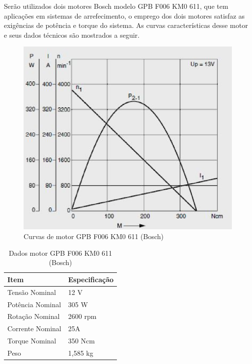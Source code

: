 Serão utilizados dois motores Bosch modelo GPB F006 KM0 611, que tem aplicações
em sistemas de arrefecimento, o emprego dos dois motores satisfaz as exigências
de potência e torque do sistema. As curvas características desse motor e seus
dados técnicos são mostrados a seguir.

\begin{figure}[H]
  \centering
    \includegraphics[width=\textwidth]{figuras/motor.eps}
  \caption{Curvas de motor GPB F006 KM0 611 (Bosch)}
  \label{fig:motor}
\end{figure}

\begin{table}[h]
\centering
\vspace{0.5cm}
\begin{tabular}{|l|l|}
\hline
Item                & Especificação \\
\hline
Tensão Nominal      & 12 V \\
Potência Nominal    & 305 W \\
Rotação Nominal     & 2600 rpm \\
Corrente Nominal    & 25A \\
Torque Nominal      & 350 Ncm \\
Peso                & 1,585 kg \\
\hline
\end{tabular}
\caption{Dados motor GPB F006 KM0 611 (Bosch)}
\label{tab:dadosmotor}
\end{table}

